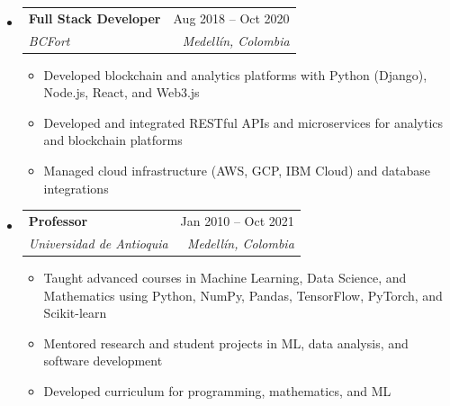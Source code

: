 \documentclass[letterpaper,11pt]{article}
\makeatletter
\newcommand{\resumeSubheading}[4]{
  \vspace{-2pt}
  \item[]
  \begin{tabular*}{\textwidth}{@{\extracolsep{\fill}}l r}
    \textbf{#1} & #2 \\
    \textit{#3} & \textit{#4} \\
  \end{tabular*}
  \vspace{-5pt}
}
\makeatother
\begin{document}
\begin{itemize}[leftmargin=0pt, itemindent=0pt, label={}, itemsep=1pt]
\resumeSubheading
{Full Stack Developer}{Aug 2018 -- Oct 2020}
{BCFort}{Medellín, Colombia}
\begin{itemize}[leftmargin=*, itemsep=0pt]
    \item Developed blockchain and analytics platforms with Python (Django), Node.js, React, and Web3.js
    \item Developed and integrated RESTful APIs and microservices for analytics and blockchain platforms
    \item Managed cloud infrastructure (AWS, GCP, IBM Cloud) and database integrations
\end{itemize}

\resumeSubheading
{Professor}{Jan 2010 -- Oct 2021}
{Universidad de Antioquia}{Medellín, Colombia}
\begin{itemize}[leftmargin=*, itemsep=0pt]
    \item Taught advanced courses in Machine Learning, Data Science, and Mathematics using Python, NumPy, Pandas, TensorFlow, PyTorch, and Scikit-learn
    \item Mentored research and student projects in ML, data analysis, and software development
    \item Developed curriculum for programming, mathematics, and ML
\end{itemize}
\end{itemize}
\end{document}
